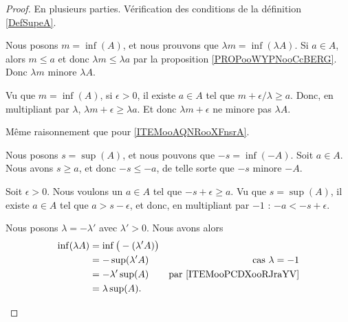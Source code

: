\begin{proof}
	En plusieurs parties. Vérification des conditions de la définition \ref{DefSupeA}.
	\begin{subproof}
		Nous posons \( m=\inf(A)\), et nous prouvons que \( \lambda m=\inf(\lambda A)\). Si \( a\in A\), alors \( m\leq a\) et donc \( \lambda m\leq \lambda a\) par la proposition \ref{PROPooWYPNooCcBERG}. Donc \( \lambda m\) minore \( \lambda A\).

		Vu que \( m=\inf(A)\), si \( \epsilon>0\), il existe \( a\in A\) tel que \( m+\epsilon/\lambda \geq a\). Donc, en multipliant par \( \lambda\), \( \lambda m+\epsilon\geq \lambda a \). Et donc \( \lambda m+\epsilon\) ne minore pas \( \lambda A\).

		Même raisonnement que pour \ref{ITEMooAQNRooXFnsrA}.

		\spitem[Pour \ref{ITEMooHPBEooGaKRDf} avec \( \lambda=-1\)]
		Nous posons \( s=\sup(A)\), et nous pouvons que \( -s=\inf(-A)\). Soit \( a\in A\). Nous avons \( s\geq a\), et donc \( -s\leq -a\), de telle sorte que \( -s\) minore \( -A\).

		Soit \( \epsilon>0\). Nous voulons un \( a\in A\) tel que \( -s+\epsilon\geq a\). Vu que \( s=\sup(A)\), il existe \( a\in A\) tel que \( a>s-\epsilon\), et donc, en multipliant par \( -1\) : \( -a<-s+\epsilon\).

		Nous posons \( \lambda=-\lambda'\) avec \( \lambda'>0\). Nous avons alors
		\begin{subequations}
			\begin{align}
				\inf(\lambda A) & =\inf\big( -(\lambda' A) \big)                                       \\
				                & =-\sup(\lambda' A)             & \text{cas \( \lambda=-1\)}          \\
				                & =-\lambda'\sup(A)              & \text{par \ref{ITEMooPCDXooRJraYV}} \\
				                & =\lambda\sup(A).
			\end{align}
		\end{subequations}
	\end{subproof}
\end{proof}

